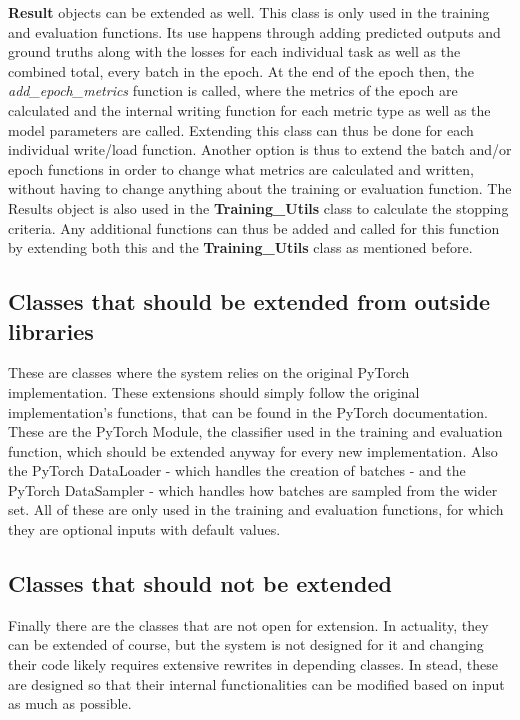 \textbf{Result} objects can be extended as well. This class is only used in the training and evaluation functions. Its use happens through adding predicted outputs and ground truths along with the losses for each individual task as well as the combined total, every batch in the epoch. At the end of the epoch then, the \textit{add\_epoch\_metrics} function is called, where the metrics of the epoch are calculated and the internal writing function for each metric type as well as the model parameters are called. Extending this class can thus be done for each individual write/load function. Another option is thus to extend the batch and/or epoch functions in order to change what metrics are calculated and written, without having to change anything about the training or evaluation function. The Results object is also used in the \textbf{Training\_Utils} class to calculate the stopping criteria. Any additional functions can thus be added and called for this function by extending both this and the \textbf{Training\_Utils} class as mentioned before.\\

\subsection{Classes that should be extended from outside libraries}

These are classes where the system relies on the original PyTorch implementation. These extensions should simply follow the original implementation's functions, that can be found in the PyTorch documentation. These are the PyTorch Module, the classifier used in the training and evaluation function, which should be extended anyway for every new implementation. Also the PyTorch DataLoader - which handles the creation of batches - and the PyTorch DataSampler - which handles how batches are sampled from the wider set. All of these are only used in the training and evaluation functions, for which they are optional inputs with default values. \\

\subsection{Classes that should not be extended}

Finally there are the classes that are not open for extension. In actuality, they can be extended of course, but the system is not designed for it and changing their code likely requires extensive rewrites in depending classes. In stead, these are designed so that their internal functionalities can be modified based on input as much as possible. \\

